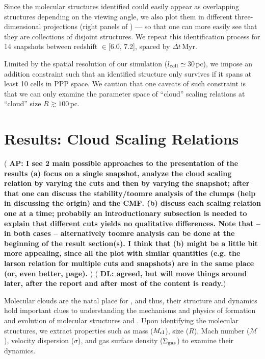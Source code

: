\IfFileExists{emulateapjlegacy.cls}{\documentclass[iop]{emulateapjlegacy}}{\documentclass[iop]{emulateapj}}
\newcommand{\AP}[1]{({\bf \color{apcolor} AP: #1})}
\newcommand{\DL}[1]{({\bf \color{dlcolor} DL: #1})}
\begin{document}
Since the molecular structures identified could
easily appear as overlapping structures depending on the viewing angle, we
also plot them in different three-dimensional projections (right panels of ) --- so that one can more
easily see that they are collections of disjoint structures.
We repeat this identification process for 14 snapshots between
redshift \z$\in$[6.0, 7.2], spaced by $\Delta t$\,Myr.


Limited by the spatial resolution of our simulation ($l_{\rm cell}\simeq$\,30\,pc), we impose an addition constraint such that an identified structure only survives if it spans at least 10 cells in PPP space. We caution that one caveats of such constraint is that we can only examine the parameter space of ``cloud'' scaling relations at ``cloud'' size $R\gtrsim100$\,pc.


\section{Results: Cloud Scaling Relations}     \label{sec:results}

\AP{I see 2 main possible approaches to the presentation of the results
%
(a) focus on a single snapshot, analyze the cloud scaling relation by varying the cuts and then by varying the snapshot; after that one can discuss the stability/toomre analysis of the clumps (help in discussing the origin) and the CMF.
%
(b) discuss each scaling relation one at a time; probabily an introductionary subsection is needed to explain that different cuts yields no qualitative differences.
%
Note that -- in both cases -- alternatively toomre analysis can be done at the beginning of the result section(s).
%
I think that (b) might be a little bit more appealing, since all the plot with similar quantities (e.g. the larson relation for multiple cuts and snapshots) are in the same place (or, even better, page).
}
\DL{agreed, but will move things around later, after the report and after most of the content is ready.}

Molecular clouds are the natal place for \SF, and thus,
their structure and dynamics hold important clues to understanding
the mechanisms and physics of formation and evolution of molecular structures and \SF.
Upon identifying the molecular structures, we extract properties such as
mass ($M_{\rm cl}$),
size ($R$),
Mach number ($\mathcal{M}$), velocity dispersion ($\sigma$), and 
gas surface density ($\Sigma_{\rm gas}$)
to examine their dynamics.
\end{document}

